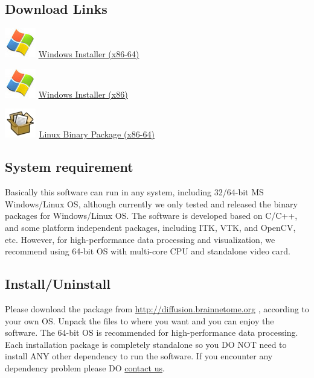 \documentclass[letterpaper,10pt,english]{sphinxmanual}
\begin{document}
\subsection{Download Links}
\label{download:download-links}
\includegraphics{winlogo.jpg} \href{https://github.com/liangfu/diffusionkit/releases/download/v1.1/DiffusionKitSetup-WIN64-v1.1.exe}{Windows Installer (x86-64)}

\includegraphics{winlogo.jpg} \href{https://github.com/liangfu/diffusionkit/releases/download/v1.1/DiffusionKitSetup-WIN32-v1.1.exe}{Windows Installer (x86)}

\includegraphics{rellogo.jpg} \href{https://github.com/liangfu/diffusionkit/releases/download/v1.1/DiffusionKitSetup-x86\_64-v1.1.tar.gz}{Linux Binary Package (x86-64)}


\subsection{System requirement}
\label{download:system-requirement}
Basically this software can run in any system, including 32/64-bit MS Windows/Linux OS,
although currently we only tested and released the binary packages for Windows/Linux OS.
The software is developed based on C/C++, and some platform independent packages,
including ITK, VTK, and OpenCV, etc.
However, for high-performance data processing and visualization,
we recommend using 64-bit OS with multi-core CPU and standalone video card.


\subsection{Install/Uninstall}
\label{download:install-uninstall}
Please download the package from \href{http://diffusion.brainnetome.org}{http://diffusion.brainnetome.org} ,
according to your own OS. Unpack the files to where you want and you can enjoy the software.
The 64-bit OS is recommended for high-performance data processing.
Each installation package is completely standalone so you DO NOT need to
install ANY other dependency to run the software.
If you encounter any dependency problem please DO \href{mailto:diffusion.kit@nlpr.ia.ac.cn}{contact us}.
\end{document}
